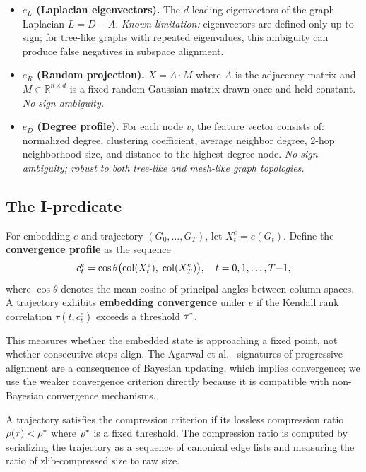 \documentclass{../shared/primo}
\begin{document}
\begin{itemize}
\item \textbf{$e_L$ (Laplacian eigenvectors).} The $d$ leading eigenvectors of the graph Laplacian $L = D - A$. \emph{Known limitation:} eigenvectors are defined only up to sign; for tree-like graphs with repeated eigenvalues, this ambiguity can produce false negatives in subspace alignment.

\item \textbf{$e_R$ (Random projection).} $X = A \cdot M$ where $A$ is the adjacency matrix and $M \in \mathbb{R}^{n \times d}$ is a fixed random Gaussian matrix drawn once and held constant. \emph{No sign ambiguity.}

\item \textbf{$e_D$ (Degree profile).} For each node $v$, the feature vector consists of: normalized degree, clustering coefficient, average neighbor degree, 2-hop neighborhood size, and distance to the highest-degree node. \emph{No sign ambiguity; robust to both tree-like and mesh-like graph topologies.}
\end{itemize}

\subsection{The I-predicate}

\begin{definition}\label{def:convergence}
For embedding $e$ and trajectory $(G_0, \ldots, G_T)$, let $X_t^e = e(G_t)$. Define the \textbf{convergence profile} as the sequence
\[
c_t^e = \cos\theta\bigl(\operatorname{col}(X_t^e),\; \operatorname{col}(X_T^e)\bigr), \quad t = 0, 1, \ldots, T{-}1,
\]
where $\cos\theta$ denotes the mean cosine of principal angles between column spaces. A trajectory exhibits \textbf{embedding convergence} under $e$ if the Kendall rank correlation $\tau(t, c_t^e)$ exceeds a threshold $\tau^*$.
\end{definition}

\begin{remark}
This measures whether the embedded state is approaching a fixed point, not whether consecutive steps align. The Agarwal et al.~\cite{agarwal2026bayesian} signatures of progressive alignment are a consequence of Bayesian updating, which implies convergence; we use the weaker convergence criterion directly because it is compatible with non-Bayesian convergence mechanisms.
\end{remark}

\begin{definition}\label{def:compression}
A trajectory satisfies the compression criterion if its lossless compression ratio $\rho(\tau) < \rho^*$ where $\rho^*$ is a fixed threshold. The compression ratio is computed by serializing the trajectory as a sequence of canonical edge lists and measuring the ratio of zlib-compressed size to raw size.
\end{definition}
\end{document}
